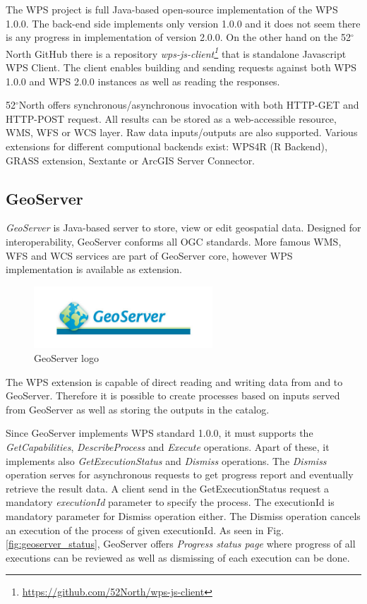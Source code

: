 \documentclass[12pt,a4paper]{article}
\begin{document}
The  WPS project is full Java-based open-source implementation of the WPS 1.0.0. The back-end side implements only version 1.0.0 and it
does not seem there is any progress in implementation of version 2.0.0. On the other hand on the 52$^{\circ}$North GitHub there is a
repository \textit{wps-js-client\footnote{\url{https://github.com/52North/wps-js-client}}} that is standalone Javascript WPS Client. 
The client enables building and sending requests against both WPS 1.0.0 and WPS 2.0.0 instances as well as reading the responses.

52$^{\circ}$North offers synchronous/asynchronous invocation with both HTTP-GET and HTTP-POST request. All results can be stored as
a web-accessible resource, WMS, WFS or WCS layer. Raw data inputs/outputs are also supported. Various extensions for different
computional backends exist: WPS4R (R Backend), GRASS extension, Sextante or ArcGIS Server Connector.

\subsection{GeoServer}
\textit{GeoServer} is Java-based server to store, view or edit geospatial data. Designed for interoperability, GeoServer conforms
all OGC standards. More famous WMS, WFS and WCS services are part of GeoServer core, however WPS implementation is available as 
extension.

\begin{figure}[h!]
\centering
\includegraphics[width=0.6\textwidth]{img/geoserver.jpg}
\caption{GeoServer logo}
\label{fig:geoserver_logo}
\end{figure}

The WPS extension is capable of direct reading and writing data from and to GeoServer. Therefore it is possible to create processes
based on inputs served from GeoServer as well as storing the outputs in the catalog.

Since GeoServer implements WPS standard 1.0.0, it must supports the \textit{GetCapabilities}, \textit{DescribeProcess} and \textit{Execute}
operations. Apart of these, it implements also \textit{GetExecutionStatus} and \textit{Dismiss} operations. The \textit{Dismiss} operation
serves for asynchronous requests to get progress report and eventually retrieve the result data. A client send in the GetExecutionStatus
request a mandatory \textit{executionId} parameter to specify the process. The executionId is mandatory parameter for Dismiss operation
either. The Dismiss operation cancels an execution of the process of given executionId. As seen in Fig. \ref{fig:geoserver_status},
GeoServer offers \textit{Progress status page} where progress of all executions can be reviewed as well as dismissing of each execution
can be done.
\end{document}
